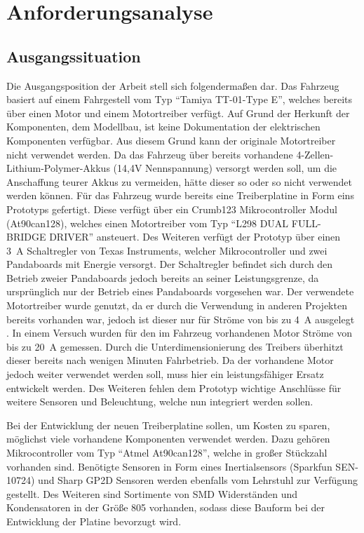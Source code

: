 
\chapter{Anforderungsanalyse}

\section{Ausgangssituation}
Die Ausgangsposition der Arbeit stell sich folgendermaßen dar. Das Fahrzeug basiert auf einem Fahrgestell vom Typ ``Tamiya TT-01-Type E'', welches bereits über einen Motor und einem Motortreiber verfügt.
Auf Grund der Herkunft der Komponenten, dem Modellbau, ist keine
Dokumentation der elektrischen Komponenten verfügbar.
Aus diesem Grund kann der originale Motortreiber nicht verwendet werden.
Da das Fahrzeug über bereits vorhandene 4-Zellen-Lithium-Polymer-Akkus (14,4V Nennspannung) versorgt werden soll, um die Anschaffung teurer Akkus zu vermeiden,
hätte dieser so oder so nicht verwendet werden können. 
Für das Fahrzeug wurde bereits eine Treiberplatine in Form eins Prototyps gefertigt.
Diese verfügt über ein Crumb123 Mikrocontroller Modul (At90can128), welches einen Motortreiber vom Typ ``L298 DUAL FULL-BRIDGE DRIVER'' ansteuert.
Des Weiteren verfügt der Prototyp über einen \SI{3}{\A} Schaltregler von Texas Instruments, welcher Mikrocontroller und zwei Pandaboards mit Energie versorgt. 
Der Schaltregler befindet sich durch den Betrieb zweier Pandaboards jedoch bereits an seiner Leistungsgrenze, da ursprünglich nur der Betrieb eines Pandaboards
vorgesehen war. Der verwendete Motortreiber wurde genutzt, da er durch die Verwendung in anderen Projekten bereits vorhanden war, jedoch ist dieser 
nur für Ströme von bis zu \SI{4}{\A} ausgelegt \cite{L298}. In einem Versuch wurden für den im Fahrzeug vorhandenen Motor Ströme von bis zu \SI{20}{\A} gemessen. 
Durch die Unterdimensionierung des Treibers überhitzt dieser bereits nach wenigen Minuten Fahrbetrieb.
Da der vorhandene Motor jedoch weiter verwendet werden soll, muss hier ein leistungsfähiger Ersatz 
entwickelt werden. Des Weiteren fehlen dem Prototyp wichtige Anschlüsse für weitere Sensoren und Beleuchtung, welche nun integriert werden sollen. 

Bei der Entwicklung der neuen Treiberplatine sollen, um Kosten zu sparen, möglichst viele vorhandene Komponenten verwendet werden. Dazu gehören
Mikrocontroller vom Typ ``Atmel At90can128'', welche in großer Stückzahl vorhanden sind. Benötigte Sensoren in Form eines Inertialsensors (Sparkfun SEN-10724)
und Sharp GP2D Sensoren werden ebenfalls vom Lehrstuhl zur Verfügung gestellt. Des Weiteren sind Sortimente von SMD Widerständen und
Kondensatoren in der Größe 805 vorhanden, sodass diese Bauform bei der Entwicklung der Platine bevorzugt wird.

